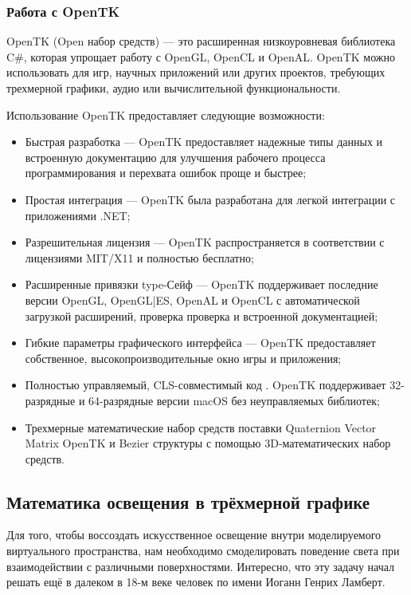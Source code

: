 \subsubsection{Работа с OpenTK}

OpenTK (Open набор средств) — это расширенная низкоуровневая библиотека C\#, которая упрощает работу с OpenGL, OpenCL и OpenAL. OpenTK можно использовать для игр, научных приложений или других проектов, требующих трехмерной графики, аудио или вычислительной функциональности.

Использование OpenTK предоставляет следующие возможности:
\begin{itemize}
	\item Быстрая разработка — OpenTK предоставляет надежные типы данных и встроенную документацию для улучшения рабочего процесса программирования и перехвата ошибок проще и быстрее;
	\item Простая интеграция — OpenTK была разработана для легкой интеграции с приложениями .NET;
	\item Разрешительная лицензия — OpenTK распространяется в соответствии с лицензиями MIT/X11 и полностью бесплатно;
	\item Расширенные привязки type-Сейф — OpenTK поддерживает последние версии OpenGL, OpenGL|ES, OpenAL и OpenCL с автоматической загрузкой расширений, проверка проверка и встроенной документацией;
	\item Гибкие параметры графического интерфейса — OpenTK предоставляет собственное, высокопроизводительные окно игры и приложения;
	\item Полностью управляемый, CLS-совместимый код . OpenTK поддерживает 32-разрядные и 64-разрядные версии macOS без неуправляемых библиотек;
	\item Трехмерные математические набор средств поставки Quaternion Vector Matrix OpenTK и Bezier структуры с помощью 3D-математических набор средств.
\end{itemize}

\subsection{Математика освещения в трёхмерной графике}

Для того, чтобы воссоздать искусственное освещение внутри моделируемого виртуального пространства, нам необходимо смоделировать поведение света при взаимодействии с различными поверхностями. Интересно, что эту задачу начал решать ещё в далеком в 18-м веке человек по имени Иоганн Генрих Ламберт.

